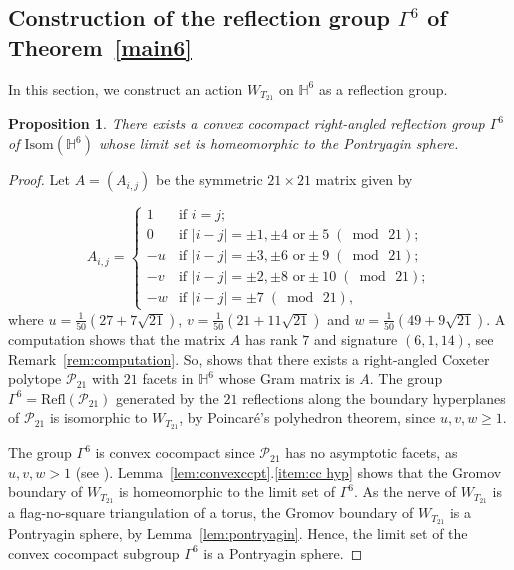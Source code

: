 \documentclass{amsart}
\theoremstyle{plain}
\newtheorem{proposition}[theorem]{Proposition}
\theoremstyle{definition}
\theoremstyle{remark}
\numberwithin{equation}{section}
\newcommand{\hh}{\mathbb H}
\newcommand{\T}{T_{21}}
\renewcommand{\geq}{\geqslant}
\begin{document}
\subsection{Construction of the reflection group \texorpdfstring{$\Gamma^6$}{Gamma6}  of Theorem~\ref{main6}}

In this section, we construct an action $W_{\T}$ on $\hh^6$ as a reflection group.

\begin{proposition}\label{main6_1st_half}
 There exists a convex cocompact right-angled reflection group $\Gamma^6$ of $\mathrm{Isom} (\hh^6)$ whose limit set is homeomorphic to the Pontryagin sphere.
\end{proposition}

\begin{proof}
Let $A = (A_{i,j})$ be the symmetric $21 \times 21$ matrix given by 

\begin{equation*}
A_{i,j} =
\begin{cases}
1 & \text{if } i = j; \\
0 & \text{if } |i - j| = \pm 1, \pm 4 \text{ or} \pm 5 \; (\bmod\, 21);\\
-u & \text{if } |i - j| = \pm 3, \pm 6 \text{ or} \pm 9 \; (\bmod\, 21);\\
-v & \text{if } |i - j| = \pm 2, \pm 8 \text{ or} \pm 10 \; (\bmod\, 21);\\
-w & \text{if } |i - j| = \pm 7 \; (\bmod\, 21),
\end{cases}
\end{equation*}
where $u= \frac{1}{50} \left(27+7\sqrt{21}\right)$, $v = \frac{1}{50} \left(21+11 \sqrt{21}\right)$ and $w = \frac{1}{50} \left(49+9 \sqrt{21}\right)$.  
A computation shows that the matrix $A$ has rank $7$ and signature $(6,1,14)$, see Remark~\ref{rem:computation}.
So, \cite[Theorem~2.1]{Vin85} shows that there exists a right-angled Coxeter polytope $\mathcal{P}_{21}$ with $21$ facets in $\hh^6$ whose Gram matrix is $A$. The group $\Gamma^6 =  \mathrm{Refl}(\mathcal{P}_{21})$ generated by the $21$ reflections along the boundary hyperplanes of $\mathcal{P}_{21}$ is isomorphic to $W_{\T}$, by Poincar\'e's polyhedron theorem, since $u, v, w \geq 1$.


The group $\Gamma^6$ is convex cocompact since $\mathcal{P}_{21}$ has no asymptotic facets, as $u, v, w > 1$ (see \cite[Theorem~4.12]{DH13}). Lemma~\ref{lem:convexccpt}.\eqref{item:cc hyp} shows that the Gromov boundary of $W_{\T}$ is homeomorphic to the limit set of $\Gamma^6$. As the nerve of $W_{\T}$ is a flag-no-square triangulation of a torus, the Gromov boundary of $W_{\T}$ is a Pontryagin sphere, by Lemma~\ref{lem:pontryagin}. Hence, the limit set of the convex cocompact subgroup $\Gamma^6$ is a Pontryagin sphere.
\end{proof}
\end{document}
